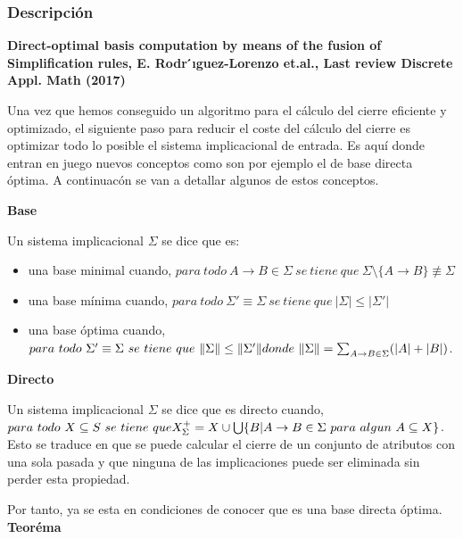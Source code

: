\subsubsection{Descripci\'on} 

\textbf{Direct-optimal basis computation by means of the fusion of Simplification rules, E. Rodr ́ıguez-Lorenzo et.al., Last review Discrete Appl. Math (2017)}

Una vez que hemos conseguido un algoritmo para el c\'alculo del cierre eficiente y optimizado, el siguiente paso para reducir el coste del c\'alculo del cierre es optimizar todo lo posible el sistema implicacional de entrada. Es aqu\'i donde entran en juego nuevos conceptos como son por ejemplo el de base directa \'optima. A continuac\'on se van a detallar algunos de estos conceptos.


\textbf{Base}

Un sistema implicacional \( \Sigma \) se dice que es:
\begin{itemize}
    \item una base minimal cuando,  \( para \ todo \ A \to B \in \Sigma \ se \ tiene \ que \ \Sigma \setminus \{A \to B\} \not\equiv \Sigma\)

    \item una base m\'inima cuando,  \( para \ todo \ \Sigma' \equiv \Sigma \ se \ tiene \ que \ |\Sigma| \leq |\Sigma'|\)

    \item una base \'optima cuando,  \( para \ todo \ \Sigma' \equiv \Sigma \ se \ tiene \ que \ \|\Sigma\| \leq \|\Sigma'\| \\ donde \ \|\Sigma\| = 
    \sum_{\substack{A \to B \in \Sigma}} (|A|+|B|) \).
\end{itemize}

\textbf{Directo}

Un sistema implicacional \( \Sigma \) se dice que es directo cuando, \( para \ todo \ X \subseteq S \ se \ tiene \ que \\ X^+_{\Sigma} =  X \cup \bigcup\{ B | A \to B \in \Sigma \ para \ algun \ A \subseteq X \} \). Esto se traduce en que se puede calcular el cierre de un conjunto de atributos con una sola pasada y que ninguna de las implicaciones puede ser eliminada sin perder esta propiedad.

Por tanto, ya se esta en condiciones de conocer que es una base directa \'optima.\\

\textbf{Teor\'ema}\cite{Bertet04} 

